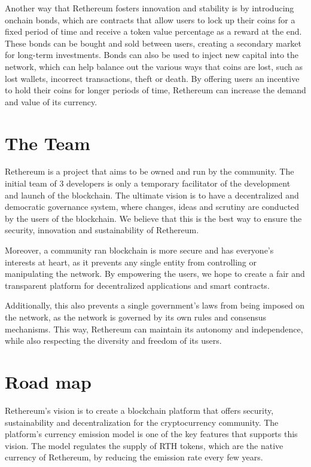 \documentclass[a4paper,onecolumn, superscriptaddress,10pt,accepted=2020-05-01,issue=1, volume=2, shorttitle=papers]{compositionalityarticle}
\begin{document}
\vspace{0.3cm}

Another way that Rethereum fosters innovation and stability is by introducing onchain bonds, which are contracts that allow users to lock up their coins for a fixed period of time and receive a token value percentage as a reward at the end. These bonds can be bought and sold between users, creating a secondary market for long-term investments. Bonds can also be used to inject new capital into the network, which can help balance out the various ways that coins are lost, such as lost wallets, incorrect transactions, theft or death. By offering users an incentive to hold their coins for longer periods of time, Rethereum can increase the demand and value of its currency.

\section{The Team}
Rethereum is a project that aims to be owned and run by the community. The initial team of 3 developers is only a temporary facilitator of the development and launch of the blockchain. The ultimate vision is to have a decentralized and democratic governance system, where changes, ideas and scrutiny are conducted by the users of the blockchain. We believe that this is the best way to ensure the security, innovation and sustainability of Rethereum.

\vspace{0.3cm}

Moreover, a community ran blockchain is more secure and has everyone's interests at heart, as it prevents any single entity from controlling or manipulating the network. By empowering the users, we hope to create a fair and transparent platform for decentralized applications and smart contracts.

\vspace{0.3cm}

Additionally, this also prevents a single government's laws from being imposed on the network, as the network is governed by its own rules and consensus mechanisms. This way, Rethereum can maintain its autonomy and independence, while also respecting the diversity and freedom of its users.

\section{Road map}

Rethereum's vision is to create a blockchain platform that offers security, sustainability and decentralization for the cryptocurrency community. The platform's currency emission model is one of the key features that supports this vision. The model regulates the supply of RTH tokens, which are the native currency of Rethereum, by reducing the emission rate every few years. 
\end{document}
